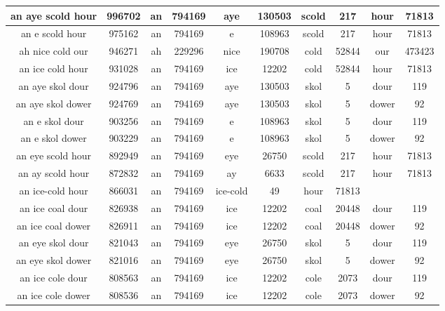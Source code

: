 \begin {longtable}{ cc|cccccccc }
 an aye scold hour   &  996702  &   an   &  794169  &   aye   &  130503  &   scold   &  217  &   hour   &  71813   \\ \hline
 an e scold hour   &  975162  &   an   &  794169  &   e   &  108963  &   scold   &  217  &   hour   &  71813   \\ \hline
 ah nice cold our   &  946271  &   ah   &  229296  &   nice   &  190708  &   cold   &  52844  &   our   &  473423   \\ \hline
 an ice cold hour   &  931028  &   an   &  794169  &   ice   &  12202  &   cold   &  52844  &   hour   &  71813   \\ \hline
 an aye skol dour   &  924796  &   an   &  794169  &   aye   &  130503  &   skol   &  5  &   dour   &  119   \\ \hline
 an aye skol dower   &  924769  &   an   &  794169  &   aye   &  130503  &   skol   &  5  &   dower   &  92   \\ \hline
 an e skol dour   &  903256  &   an   &  794169  &   e   &  108963  &   skol   &  5  &   dour   &  119   \\ \hline
 an e skol dower   &  903229  &   an   &  794169  &   e   &  108963  &   skol   &  5  &   dower   &  92   \\ \hline
 an eye scold hour   &  892949  &   an   &  794169  &   eye   &  26750  &   scold   &  217  &   hour   &  71813   \\ \hline
 an ay scold hour   &  872832  &   an   &  794169  &   ay   &  6633  &   scold   &  217  &   hour   &  71813   \\ \hline
 an ice-cold hour   &  866031  &   an   &  794169  &   ice-cold   &  49  &   hour   &  71813  &     &     \\ \hline
 an ice coal dour   &  826938  &   an   &  794169  &   ice   &  12202  &   coal   &  20448  &   dour   &  119   \\ \hline
 an ice coal dower   &  826911  &   an   &  794169  &   ice   &  12202  &   coal   &  20448  &   dower   &  92   \\ \hline
 an eye skol dour   &  821043  &   an   &  794169  &   eye   &  26750  &   skol   &  5  &   dour   &  119   \\ \hline
 an eye skol dower   &  821016  &   an   &  794169  &   eye   &  26750  &   skol   &  5  &   dower   &  92   \\ \hline
 an ice cole dour   &  808563  &   an   &  794169  &   ice   &  12202  &   cole   &  2073  &   dour   &  119   \\ \hline
 an ice cole dower   &  808536  &   an   &  794169  &   ice   &  12202  &   cole   &  2073  &   dower   &  92   \\ \hline

\end{longtable}
